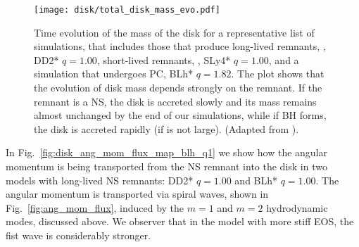 \begin{figure}[t]
    \centering 
    \texttt{[image: disk/total\_disk\_mass\_evo.pdf]}
    \caption{
        Time evolution of the mass of the disk for a representative list 
        of simulations, that includes those that produce long-lived 
        remnants, \eg, DD2* $q=1.00$, short-lived remnants, 
        \eg, SLy4* $q=1.00$, and a simulation that undergoes \ac{PC}, 
        BLh* $q=1.82$. 
        The plot shows that the \pmerg{} evolution of disk mass depends 
        strongly on the remnant. If the remnant is a \ac{NS}, the disk is 
        accreted slowly and its mass remains almost unchanged by the end 
        of our simulations, while if \ac{BH} forms, the disk is accreted 
        rapidly (if \mr{} is not large).
        (Adapted from \citet{Nedora:2020pak}).
    } 
    \label{fig:disk_mass_evo}
\end{figure}

In Fig.~\ref{fig:disk_ang_mom_flux_map_blh_q1} we show how the angular momentum is 
being transported from the \ac{NS} remnant into the disk 
in two models with long-lived 
\ac{NS} remnants: %
DD2* $q=1.00$ and BLh* $q=1.00$.
%
%
The angular momentum is transported via spiral waves, 
shown in Fig.~\ref{fig:ang_mom_flux}, induced by the 
$m=1$ and $m=2$ hydrodynamic modes, discussed above.
%
We observer that in the model with more stiff \ac{EOS}, %
the fist wave is considerably stronger. 


